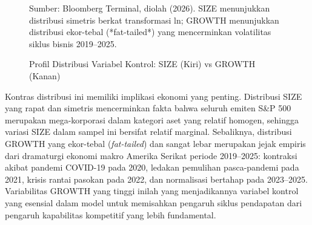 \documentclass[12pt,a4paper]{article}
\begin{document}
\begin{figure}[H]
\caption{Profil Distribusi Variabel Kontrol: SIZE (Kiri) vs GROWTH (Kanan)}
\centering
{}
\vspace{1.5em}
{\small Sumber: Bloomberg Terminal, diolah (2026). SIZE menunjukkan distribusi simetris berkat transformasi ln; GROWTH menunjukkan distribusi ekor-tebal (*fat-tailed*) yang mencerminkan volatilitas siklus bisnis 2019--2025.}
\end{figure}

Kontras distribusi ini memiliki implikasi ekonomi yang penting.
Distribusi SIZE yang rapat dan simetris mencerminkan fakta bahwa seluruh
emiten S\&P 500 merupakan mega-korporasi dalam kategori aset yang
relatif homogen, sehingga variasi SIZE dalam sampel ini bersifat relatif
marginal. Sebaliknya, distribusi GROWTH yang ekor-tebal
(\emph{fat-tailed}) dan sangat lebar merupakan jejak empiris dari
dramaturgi ekonomi makro Amerika Serikat periode 2019--2025: kontraksi
akibat pandemi COVID-19 pada 2020, ledakan pemulihan pasca-pandemi pada
2021, krisis rantai pasokan pada 2022, dan normalisasi bertahap pada
2023--2025. Variabilitas GROWTH yang tinggi inilah yang menjadikannya
variabel kontrol yang esensial dalam model untuk memisahkan pengaruh
siklus pendapatan dari pengaruh kapabilitas kompetitif yang lebih
fundamental.
\end{document}
